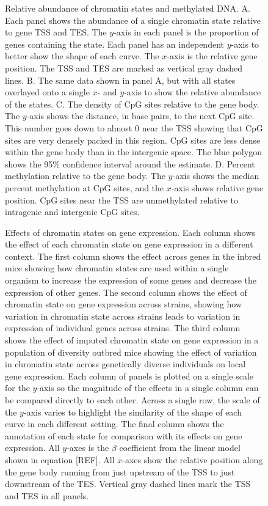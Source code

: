 \documentclass[10pt,letterpaper]{article}
\begin{document}
\begin{figure}[ht]
\centering
\caption{Relative abundance of chromatin states and methylated DNA. A. Each panel shows
the abundance of a single chromatin state relative to gene TSS and TES. The 
$y$-axis in each panel is the proportion of genes containing the state. Each
panel has an independent $y$-axis to better show the shape of each curve.
The $x$-axis is the relative gene position. The TSS and TES are marked as vertical
gray dashed lines. B. The same data shown in panel A, but with all states overlayed
onto a single $x$- and $y$-axis to show the relative abundance of the states. 
C. The density of CpG sites relative to the gene body. The $y$-axis shows the 
distance, in base pairs, to the next CpG site. This number goes down to almost
0 near the TSS showing that CpG sites are very densely packed in this region. 
CpG sites are less dense within the gene body than in the intergenic space. 
The blue polygon shows the 95\% confidence interval around the estimate. D. 
Percent methylation relative to the gene body. The $y$-axis shows the median 
percent methylation at CpG sites, and the $x$-axis shows relative gene position. 
CpG sites near the TSS are unmethylated relative to intragenic and intergenic
CpG sites.}
\label{fig:state_abundance}
\end{figure}

\begin{figure}[ht]
\centering
\caption{Effects of chromatin states on gene expression. Each column shows the effect
of each chromatin state on gene expression in a different context. The first
column shows the effect across genes in the inbred mice showing how chromatin
states are used within a single organism to increase the expression of some genes
and decrease the expression of other genes. The second column shows the effect
of chromatin state on gene expression across strains, showing how variation in
chromatin state across strains leads to variation in expression of individual
genes across strains. The third column shows the effect of imputed chromatin 
state on gene expression in a population of diversity outbred mice showing the
effect of variation in chromatin state across genetically diverse individuals
on local gene expression. Each column of panels is plotted on a single scale
for the $y$-axis so the magnitude of the effects in a single column can be 
compared directly to each other. Across a single row, the scale of the $y$-axis 
varies to highlight the similarity of the shape of each curve in each different 
setting. The final column shows the annotation of each state for comparison with
its effects on gene expression. All $y$-axes is the $\beta$ coefficient from the 
linear model shown in equation [REF]. All $x$-axes show the relative 
position along the gene body running from just upstream of the TSS to just downstream 
of the TES. Vertical gray dashed lines mark the TSS and TES in all panels.}
\label{fig:state_effects}
\end{figure}
\end{document}
